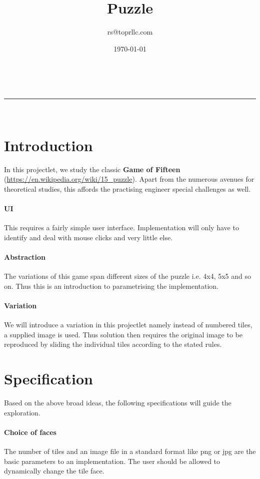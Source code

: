 \documentclass[a4paper,12pt]{article}
\makeatletter
\newcommand{\linia}{\rule{\linewidth}{0.5pt}}
\theoremstyle{mytheor}
\renewcommand{\maketitle}{
\begin{center}
\vspace{2ex}
{\huge \textsc{\@title}}
\vspace{1ex}
\\
\linia\\
\@author \hfill \@date
\vspace{4ex}
\end{center}
}
\makeatother
\begin{document}
\title{Puzzle}

\author{rs@toprllc.com}

\date{\today}

\maketitle

\section*{Introduction}

In this projectlet, we study the classic \textbf{Game of Fifteen} (\url{https://en.wikipedia.org/wiki/15_puzzle}). Apart from the numerous avenues for theoretical studies, this affords the practising engineer special challenges as well.

\paragraph{UI} This requires a fairly simple user interface. Implementation will only have to identify and deal with mouse clicks and very little else.

\paragraph{Abstraction} The variations of this game span different sizes of the puzzle i.e. 4x4, 5x5 and so on. Thus this is an introduction to parametrising the implementation.

\paragraph{Variation} We will introduce a variation in this projectlet namely instead of numbered tiles, a supplied image is used. Thus solution then requires the original image to be reproduced by sliding the individual tiles according to the stated rules.

\section*{Specification}

Based on the above broad ideas, the following specifications will guide the exploration.

\paragraph{Choice of faces} The number of tiles and an image file in a standard format like png or jpg are the basic parameters to an implementation. The user should be allowed to dynamically change the tile face.
\end{document}
